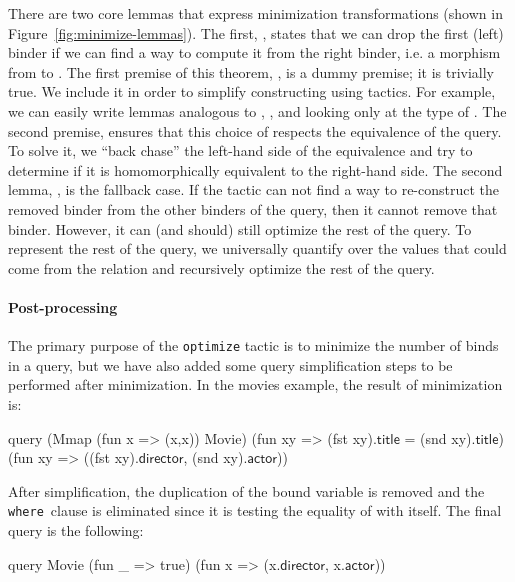 \documentclass[preprint]{sigplanconf}
\newcommand{\WHERE}{{\tt where}\relax\ifmmode\ \else\xspace\fi}
\begin{document}
There are two core lemmas that express minimization transformations (shown in Figure~\ref{fig:minimize-lemmas}).
The first, , states that we can drop the first (left) binder if we can find a way to compute it from the right binder, i.e. a morphism from  to .
The first premise of this theorem, , is a dummy premise; it is trivially true.
We include it in order to simplify constructing  using tactics.
For example, we can easily write lemmas analogous to , , and  looking only at the type of .
The second premise, ensures that this choice of  respects the equivalence of the query.
To solve it, we ``back chase'' the left-hand side of the equivalence and try to determine if it is homomorphically equivalent to the right-hand side.
The second lemma, , is the fallback case. %
If the tactic can not find a way to re-construct the removed binder from the other binders of the query, then it cannot remove that binder.
However, it can (and should) still optimize the rest of the query.
To represent the rest of the query, we universally quantify over the values that could come from the relation and recursively optimize the rest of the query.

\paragraph{Post-processing}
The primary purpose of the {\tt optimize} tactic is to minimize the number of binds in a query, but we have also added some query simplification steps to be performed after minimization.  In the movies example, the result of minimization is:
\begin{coq}
query (Mmap (fun x => (x,x)) Movie)
      (fun xy => (fst xy).$\textsf{title}$ = (snd xy).$\textsf{title}$)
      (fun xy => ((fst xy).$\textsf{director}$, (snd xy).$\textsf{actor}$))
\end{coq}
After simplification, the duplication of the bound variable is removed and the \WHERE clause is eliminated since it is testing the equality of  with itself.  The final query is the following:
\begin{coq}
query Movie (fun _ => true) (fun x => (x.$\textsf{director}$, x.$\textsf{actor}$))
\end{coq}
\end{document}
